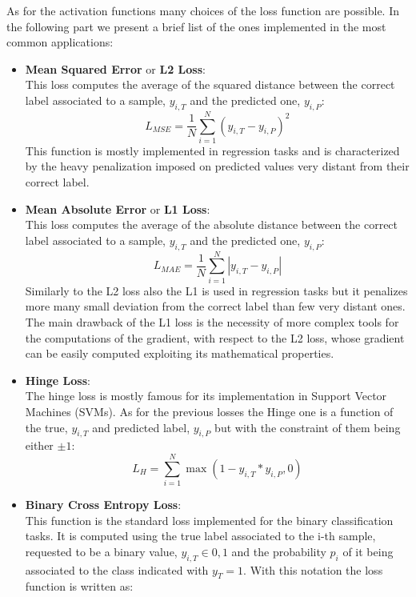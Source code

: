 As for the activation functions many choices of the loss function are possible. In the following part we present a brief list of the ones implemented in the most common applications:
\begin{itemize}
    \item \textbf{Mean Squared Error} or \textbf{L2 Loss}:\\
    This loss computes the average of the squared distance between the correct label associated to a sample, $y_{i,T}$ and the predicted one, $y_{i,P}$:
    \begin{equation}
        L_{MSE}= \frac{1}{N}\sum_{i=1}^N \left(y_{i,T}-y_{i,P}\right)^2
    \end{equation}
    This function is mostly implemented in regression tasks and is characterized by the heavy penalization imposed on predicted values very distant from their correct label. 
    \item \textbf{Mean Absolute Error} or \textbf{L1 Loss}:\\
    This loss computes the average of the absolute distance between the correct label associated to a sample, $y_{i,T}$ and the predicted one, $y_{i,P}$:
    \begin{equation}
        L_{MAE}= \frac{1}{N}\sum_{i=1}^N \left|y_{i,T}-y_{i,P}\right|
    \end{equation}
    Similarly to the L2 loss also the L1 is used in regression tasks but it penalizes more many small deviation from the correct label than few very distant ones. The main drawback of the L1 loss is the necessity of more complex tools for the computations of the gradient, with respect to the L2 loss, whose gradient can be easily computed exploiting its mathematical properties. 
\item \textbf{Hinge Loss}:\\
    The hinge loss is mostly famous for its implementation in Support Vector Machines (SVMs). As for the previous losses the Hinge one is a function of the true, $y_{i,T}$ and  predicted label, $y_{i,P}$ but with the constraint of them being either $\pm 1$:
    \begin{equation}
        L_{H}= \sum_{i=1}^N \max\left( 1-y_{i,T}*y_{i,P},0\right)
    \end{equation}
\item \textbf{Binary Cross Entropy Loss}:\\
    This function is the standard loss implemented for the binary classification tasks. It is computed using the true label associated to the i-th sample, requested to be a binary value, $y_{i,T}\in{0,1}$ and the probability $p_{i}$ of it being associated to the class indicated with $y_{T}=1$. With this notation the loss function is written as:

\end{itemize}
